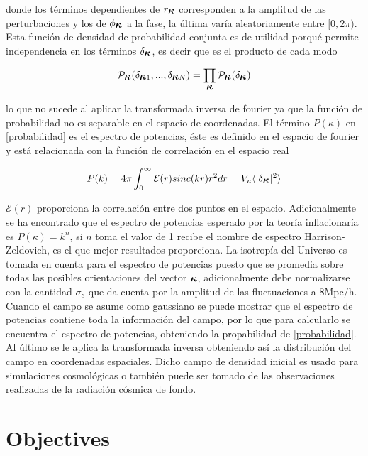 \documentclass[a4,useAMS,usenatbib,usegraphicx,12pt]{article}
\begin{document}
donde los términos dependientes de $r_{\mbox{\boldmath$\kappa$}}$ corresponden a la amplitud de las perturbaciones 
y los de $\phi_{\mbox{\boldmath$\kappa$}}$ a la fase, la última varía aleatoriamente entre $[0,2\pi)$. 
Esta función de densidad de probabilidad conjunta es de utilidad porqué permite independencia en los términos 
$\delta_{\mbox{\boldmath$\kappa$}}$, es decir que es el producto de cada modo 

\[
\mathcal{P}_{\mbox{\boldmath$\kappa$}}(\delta_{\mbox{\boldmath$\kappa$}1},...,\delta_{\mbox{\boldmath$\kappa$}N})=
\prod_{\mbox{\boldmath$\kappa$}}\mathcal{P}_{\mbox{\boldmath$\kappa$}}(\delta_{\mbox{\boldmath$\kappa$}})
\]

lo que no sucede al aplicar la transformada inversa de fourier ya que la función de probabilidad no es separable en el espacio de
coordenadas. El término $P(\kappa)$ en \ref{probabilidad} es el espectro de potencias, éste es definido en el 
espacio de fourier y está relacionada con la función de correlación en el espacio real

\[
P(k) = 4\pi\int_0^\infty \mathcal{E} (r)sinc(kr)r^2dr = V_u  \langle|\delta_{\mbox{\boldmath$\kappa$}}|^2\rangle
\]

$\mathcal{E} (r)$ proporciona la correlación entre dos puntos en el espacio. Adicionalmente se ha encontrado
que el espectro de potencias esperado por la teoría inflacionaría es $P(\kappa)= k^n$, si $n$ toma
el valor de 1 recibe el nombre de espectro Harrison-Zeldovich, es el que mejor 
resultados proporciona. La isotropía del Universo es tomada en cuenta
para el espectro de potencias puesto que se promedia sobre todas las posibles orientaciones del vector 
${\mbox{\boldmath$\kappa$}}$, adicionalmente debe normalizarse con la cantidad $\sigma_8$ que da cuenta
por la amplitud de las fluctuaciones a $8$Mpc/h. 
Cuando el campo se asume como gaussiano se puede mostrar 
que el espectro de potencias contiene toda la información del campo, por lo que
para calcularlo se encuentra el espectro de potencias,
obteniendo la propabilidad de \ref{probabilidad}. Al último se le aplica la transformada inversa
obteniendo así la distribución del campo en coordenadas espaciales. Dicho campo de densidad inicial es usado
para simulaciones cosmológicas o también puede ser tomado de las observaciones realizadas
de la radiación cósmica de fondo. 

\section{Objectives}
\end{document}
